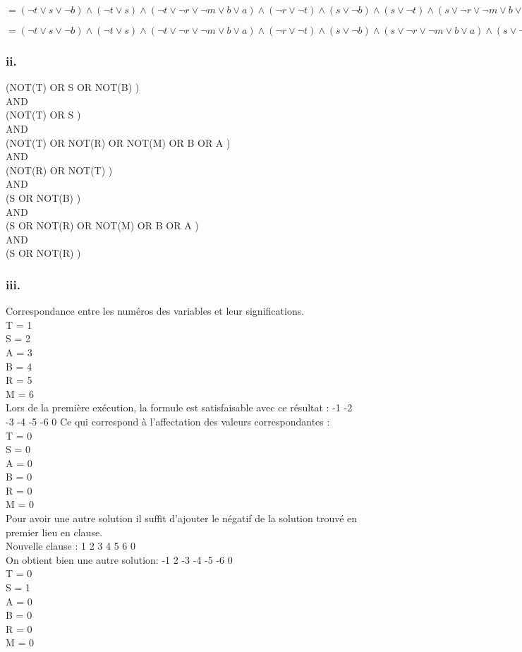 \documentclass[12pt]{report}
\begin{document}
$= (\lnot t \lor s \lor \lnot b) \land (\lnot t \lor s) \land (\lnot t \lor \lnot r \lor \lnot m \lor b \lor a) \land (\lnot r \lor \lnot t) \land (s \lor \lnot b) \land (s \lor \lnot t) \land (s \lor \lnot r \lor \lnot m \lor b \lor a) \land (\lnot r \lor s)$

$= (\lnot t \lor s \lor \lnot b) \land (\lnot t \lor s) \land (\lnot t \lor \lnot r \lor \lnot m \lor b \lor a) \land (\lnot r \lor \lnot t) \land (s \lor \lnot b) \land (s \lor \lnot r \lor \lnot m \lor b \lor a) \land (s \lor \lnot r)$

\subsubsection*{ii.}
(NOT(T) OR S OR NOT(B) ) \\
AND \\
(NOT(T) OR S ) \\
AND \\
(NOT(T) OR NOT(R) OR NOT(M) OR B OR A ) \\
AND \\
(NOT(R) OR NOT(T) ) \\
AND \\
(S OR NOT(B) ) \\
AND \\
(S OR NOT(R) OR NOT(M) OR B OR A ) \\
AND \\
(S OR NOT(R) )

\subsubsection*{iii.}
Correspondance entre les numéros des variables et leur significations. \\
T = 1 \\
S = 2 \\
A = 3 \\
B = 4 \\
R = 5 \\
M = 6 \\
Lors de la première exécution, la formule est satisfaisable avec ce résultat : -1 -2 -3 -4 -5 -6 0
Ce qui correspond à l'affectation des valeurs correspondantes : \\
T = 0 \\
S = 0 \\
A = 0 \\
B = 0 \\
R = 0 \\
M = 0 \\
Pour avoir une autre solution il suffit d'ajouter le négatif de la solution trouvé en premier lieu en clause. \\
Nouvelle clause :  1 2 3 4 5 6 0 \\
On obtient bien une autre solution: -1 2 -3 -4 -5 -6 0 \\
T = 0 \\
S = 1 \\
A = 0 \\
B = 0 \\
R = 0 \\
M = 0 
\end{document}
